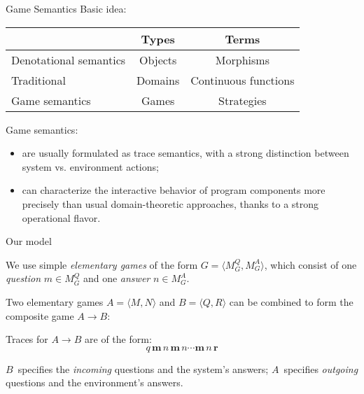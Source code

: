 \documentclass{beamer}
\begin{document}
\begin{frame}{Game Semantics} %
Basic idea:
\begin{center}
  \begin{tabular}{lcc}
  \hline
   & Types & Terms \\
  \hline
  Denotational semantics & Objects & Morphisms \\
  \hspace{1em} Traditional & Domains & Continuous functions \\
  \hspace{1em} Game semantics & Games & Strategies \\
  \hline
  \end{tabular}
\end{center}

\vfill
Game semantics:
\begin{itemize}
\item
  are usually formulated as trace semantics,
  with a strong distinction between
  system vs. environment actions;
\item
  can characterize
  the interactive behavior of program components
  more precisely than
  usual domain-theoretic approaches,
  thanks to a strong operational flavor.
\end{itemize}
\vfill
\end{frame}

\begin{frame}{Our model} %

We use simple
\emph{elementary games}
of the form $G = \langle M_G^Q, M_G^A \rangle$,
which consist of
one \emph{question} $m \in M_G^Q$ and
one \emph{answer} $n \in M_G^A$.

\vspace{1ex}
Two elementary games
$A = \langle M, N \rangle$ and
$B = \langle Q, R \rangle$
can be combined to form
the composite game $A \rightarrow B$:
\begin{center}
\end{center}

Traces for $A \rightarrow B$ are of the form:
\[
    q \, \mathbf{m} \, n \, \mathbf{m} \, n \cdots \mathbf{m} \, n \, \mathbf{r}
\]

$B$~specifies the \emph{incoming} questions
and the system's answers;
$A$~specifies \emph{outgoing}
questions and the environment's answers.
\end{frame}
\end{document}
